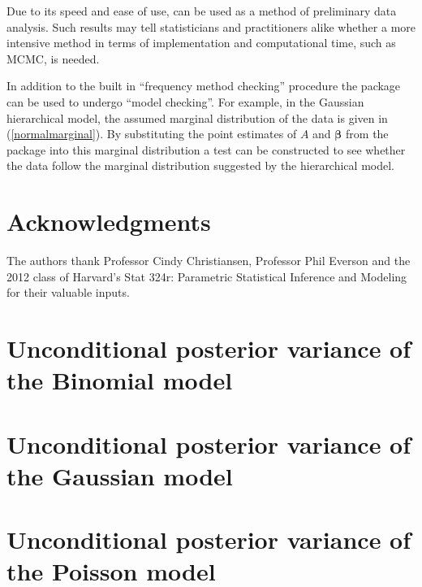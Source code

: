 \documentclass[article]{jss}
\begin{document}
Due to its speed and ease of use,  can be used as a method of preliminary data analysis. Such results may tell statisticians and practitioners alike whether a more intensive method in terms of implementation and computational time, such as MCMC, is needed. 


In addition to the built in ``frequency method checking'' procedure the package can be used to undergo ``model checking''. For example, in the Gaussian hierarchical model, the assumed marginal distribution of the data is given in (\ref{normalmarginal}). By substituting the point estimates of $A$ and $\boldsymbol{\beta}$ from the package into this marginal distribution a test can be constructed to see whether the data follow the marginal distribution suggested by the hierarchical model.


\section[acknowledgments]{Acknowledgments}
The authors thank Professor Cindy Christiansen, Professor Phil Everson and the 2012 class of Harvard's Stat 324r: Parametric Statistical Inference and Modeling for their valuable inputs.

\appendix
\section{Unconditional posterior variance of the Binomial model}\label{apppostvar}
\section{Unconditional posterior variance of the Gaussian model}\label{apppostvar_normal}

\section{Unconditional posterior variance of the Poisson model}\label{apppostvar_poisson}


\end{document}
